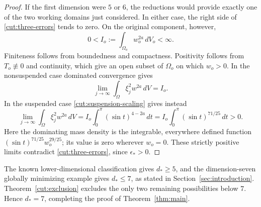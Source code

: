 \begin{proof}
If the first dimension were $5$ or $6$, the reductions would provide
exactly one of the two working domains just considered.  In either case,
the right side of \eqref{cut:three-errors} tends to zero.  On the original
component, however,
\[
 0<I_o:=\int_{\Omega_o}w_o^{2a}\,dV_o<\infty.
\]
Finiteness follows from boundedness and compactness.  Positivity follows
from $T_o\not\equiv0$ and continuity, which give an open subset of
$\Omega_o$ on which $w_o>0$.  In the nonsuspended case dominated
convergence gives
\[
 \lim_{j\to\infty}\int_\Omega\xi_j^2w^{2a}\,dV=I_o.
\]
In the suspended case \eqref{cut:suspension-scaling} gives instead
\[
 \lim_{j\to\infty}\int_\Omega\xi_j^2w^{2a}\,dV
 = I_o\int_0^\pi(\sin t)^{4-2a}\,dt
 = I_o\int_0^\pi(\sin t)^{71/25}\,dt>0.
\]
Here the dominating mass density is the integrable, everywhere defined
function $(\sin t)^{71/25}w_o^{29/25}$; its value is zero wherever
$w_o=0$.  These strictly positive limits contradict
\eqref{cut:three-errors}, since $\epsilon_*>0$.
\end{proof}

The known lower-dimensional classification gives $d_*\geq5$, and the
dimension-seven globally minimizing example gives $d_*\leq7$, as stated
in Section~\ref{sec:introduction}.  Theorem~\ref{cut:exclusion} excludes the only two
remaining possibilities below $7$.  Hence $d_*=7$, completing the proof
of Theorem~\ref{thm:main}.
